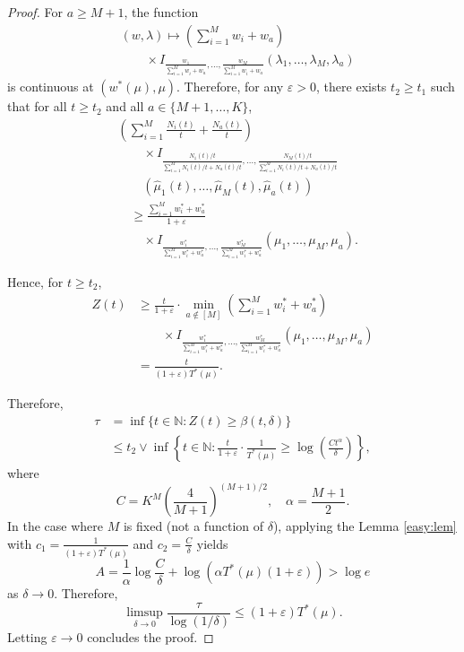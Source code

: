 \documentclass[10pt,a4paper]{amsart}
\newcommand{\nn}{\nonumber}
\begin{document}
\begin{proof}
For $a \geq M+1$, the function
\begin{align*}
&(w, \lambda) \mapsto \left(\sum_{i=1}^M w_i + w_a \right) \nn\\
&\qquad  \times I_{\frac{w_1}{\sum_{i=1}^M w_i + w_a}, \ldots, \frac{w_M}{\sum_{i=1}^M w_i + w_a}}(\lambda_1, \ldots, \lambda_M, \lambda_a)
\end{align*}
is continuous at $(w^*(\mu), \mu)$. Therefore, for any $ \varepsilon > 0$, there exists $t_2 \geq t_1$ such that for all $t \geq t_2$ and all $a \in \{M+1, \ldots, K\}$,
\begin{align}
&\left( \sum_{i=1}^M \frac{N_i(t)}{t} + \frac{N_a(t)}{t} \right) \nn \\
&\qquad \times  I_{\frac{N_1(t)/t}{\sum_{i=1}^M N_i(t)/t + N_a(t)/t}, \ldots, \frac{N_M(t)/t}{\sum_{i=1}^M N_i(t)/t + N_a(t)/t}} \nn\\
&\qquad \left( \hat{\mu}_1(t), \ldots, \hat{\mu}_M(t), \hat{\mu}_a(t) \right) \nn \\
&\quad \geq \frac{\sum_{i=1}^M w_i^* + w_a^*}{1+\varepsilon} \nn\\
&\qquad \times  I_{\frac{w_1^*}{\sum_{i=1}^M w_i^* + w_a^*}, \ldots, \frac{w_M^*}{\sum_{i=1}^M w_i^* + w_a^*}} (\mu_1, \ldots, \mu_M, \mu_a).
\end{align}

Hence, for $t \geq t_2$,
\begin{align}
Z(t) &\geq \frac{t}{1+\varepsilon} \cdot \min_{a \notin [M]} \left(\sum_{i=1}^M w_i^* + w_a^*\right) \nn\\
&\qquad \times  I_{\frac{w_1^*}{\sum_{i=1}^M w_i^* + w_a^*}, \ldots, \frac{w_M^*}{\sum_{i=1}^M w_i^* + w_a^*}} (\mu_1, \ldots, \mu_M, \mu_a) \nn\\
&= \frac{t}{(1+\varepsilon) T^*(\mu)}.
\end{align}

Therefore,
\begin{align}
\tau &= \inf \{ t \in \mathbb{N} : Z(t) \geq \beta(t, \delta) \} \nn \\
&\leq t_2 \vee \inf \left\{ t \in \mathbb{N} : \frac{t}{1+\varepsilon} \cdot \frac{1}{T^*(\mu)} \geq \log\left(\frac{C t^{\alpha}}{\delta}\right) \right\},
\end{align}
where
\[
C = K^M \left( \frac{4}{M+1} \right)^{(M+1)/2}, \quad \alpha = \frac{M+1}{2}.
\]
In the case where \( M \) is fixed (not a function of \( \delta \)), applying the Lemma \ref{easy:lem} with \( c_1 = \frac{1}{(1+\varepsilon) T^*(\mu)} \) and \( c_2 = \frac{C}{\delta} \) yields
\[
A = \frac{1}{\alpha} \log \frac{C}{\delta} + \log\left( \alpha T^*(\mu)(1+\varepsilon) \right) > \log e
\]
as \( \delta \to 0 \). Therefore,
\[
\limsup_{\delta \to 0} \frac{\tau}{\log(1/\delta)} \leq (1 + \varepsilon) T^*(\mu).
\]
Letting \( \varepsilon \to 0 \) concludes the proof.

\end{proof}
\end{document}
